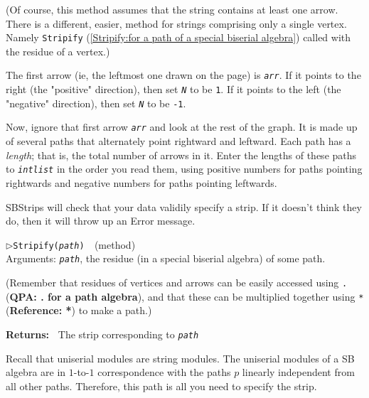 \documentclass[a4paper,11pt]{report}
\begin{document}
{{{ (Of course, this method assumes that the string contains at least one arrow.
There is a different, easier, method for strings comprising only a single
vertex. Namely \texttt{Stripify} (\ref{Stripify:for a path of a special biserial algebra}) called with the residue of a vertex.) 

 The first arrow (ie, the leftmost one drawn on the page) is \mbox{\texttt{\mdseries\slshape arr}}. If it points to the right (the "positive" direction), then set \mbox{\texttt{\mdseries\slshape N}} to be \texttt{1}. If it points to the left (the "negative" direction), then set \mbox{\texttt{\mdseries\slshape N}} to be \texttt{-1}. 

 Now, ignore that first arrow \mbox{\texttt{\mdseries\slshape arr}} and look at the rest of the graph. It is made up of several paths that
alternately point rightward and leftward. Each path has a \emph{length}; that is, the total number of arrows in it. Enter the lengths of these paths
to \mbox{\texttt{\mdseries\slshape int{\textunderscore}list}} in the order you read them, using positive numbers for paths pointing
rightwards and negative numbers for paths pointing leftwards. 

 \textsf{SBStrips} will check that your data validily specify a strip. If it doesn't think they
do, then it will throw up an Error message. 

 \noindent\textcolor{FuncColor}{$\triangleright$\enspace\texttt{Stripify({\mdseries\slshape path})
\label{Stripify:for a path of a special biserial algebra}
}\hfill{\scriptsize (method)}}\\


 Arguments: \mbox{\texttt{\mdseries\slshape path}}, the residue (in a special biserial algebra) of some path. 

 (Remember that residues of vertices and arrows can be easily accessed using \texttt{.} (\textbf{QPA: . for a path algebra}), and that these can be multiplied together using \texttt{\texttt{}*} (\textbf{Reference: *}) to make a path.) 

 \textbf{\indent Returns:\ }
 The strip corresponding to \mbox{\texttt{\mdseries\slshape path}} 



 Recall that uniserial modules are string modules. The uniserial modules of a
SB algebra are in $1$-to-$1$ correspondence with the paths $p$ linearly independent from all other paths. Therefore, this path is all you
need to specify the strip. 

}}}
\end{document}
